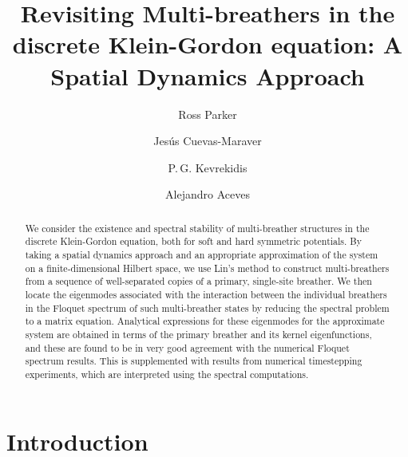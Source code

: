 \documentclass[12pt,reqno]{amsart}
\theoremstyle{definition}
\begin{document}
\title[Revisiting Multi-breathers in the discrete Klein-Gordon equation]{Revisiting Multi-breathers in the discrete Klein-Gordon equation: A Spatial Dynamics Approach}

\author{Ross Parker}
\address{Department of Mathematics, Southern Methodist University, 
Dallas, TX 75275, USA}

\author{Jes\'us Cuevas-Maraver}
\address{Grupo de F\'{\i}sica No Lineal, Departamento de F\'{\i}sica Aplicada I,
Universidad de Sevilla. Escuela Polit\'{e}cnica Superior, C/ Virgen de Africa, 7, 41011-Sevilla, Spain}
\address{Instituto de Matem\'{a}ticas de la Universidad de Sevilla (IMUS). Edificio
Celestino Mutis. Avda. Reina Mercedes s/n, 41012-Sevilla, Spain}

\author{P.\,G. Kevrekidis} 
\address{Department of Mathematics and Statistics, University of Massachusetts, Amherst MA 01003, USA}

\author{Alejandro Aceves}
\address{Department of Mathematics, Southern Methodist University, 
Dallas, TX 75275, USA}

\begin{abstract}
	We consider the existence and spectral stability of multi-breather structures in the discrete Klein-Gordon equation, both for soft and hard symmetric potentials. By taking a spatial dynamics approach and an appropriate approximation of the system on a finite-dimensional Hilbert space, we use Lin's method to construct multi-breathers from a sequence of well-separated copies of a primary, single-site breather. We then locate the eigenmodes associated with the interaction between the
	individual breathers in the Floquet spectrum of such multi-breather
	states by reducing the spectral problem to a matrix equation. Analytical expressions for these eigenmodes for the approximate system are obtained in terms of the primary breather and its kernel eigenfunctions, and these are found to be in very good agreement with the numerical Floquet spectrum results. This is supplemented with results from numerical timestepping experiments, which are interpreted using the spectral computations.
\end{abstract}

\maketitle

\section{Introduction}
\end{document}
